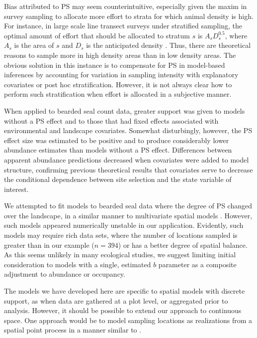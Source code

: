 \documentclass[times,mee,doublespace,]{besauth2}
\begin{document}
Bias attributed to PS may seem counterintuitive, especially given the maxim in survey sampling to allocate more effort to strata for which animal density is high. For instance, in large scale line transect surveys under stratified sampling, the optimal amount of effort that should be allocated to stratum $s$ is $A_s D_s^{0.5}$, where $A_s$ is the area of $s$ and $D_s$ is the anticipated density \citep[][eqn 7.7]{BucklandEtAl2001}.  Thus, there are theoretical reasons to sample more in high density areas than in low density areas. The obvious solution in this instance is to compensate for PS in model-based inferences by accounting for variation in sampling intensity with explanatory covariates or post hoc stratification. However, it is not always clear how to perform such stratification when effort is allocated in a subjective manner.

When applied to bearded seal count data, greater support was given to models without a PS effect and to those that had fixed effects associated with environmental and landscape covariates.  Somewhat disturbingly, however, the PS effect size was estimated to be positive and to produce considerably lower abundance estimates than models without a PS effect.  Differences between apparent abundance predictions decreased when covariates were added to model structure, confirming previous theoretical results \citep{DiggleEtAl2010,PatiEtAl2011} that covariates serve to decrease the conditional dependence between site selection and the state variable of interest.

We attempted to fit models to bearded seal data where the degree of PS changed over the landscape, in a similar manner to multivariate spatial models \citep{RoyleBerliner1999}. However, such models appeared numerically unstable in our application.  Evidently, such models may require rich data sets, where the number of locations sampled is greater than in our example ($n=394$) or has a better degree of spatial balance.  As this seems unlikely in many ecological studies, we suggest limiting initial consideration to models with a single, estimated $b$ parameter as a composite adjustment to abundance or occupancy.

The models we have developed here are specific to spatial models with discrete support, as when data are gathered at a plot level, or aggregated prior to analysis.  However, it should be possible to extend our approach to continuous space.  One approach would be to model sampling locations as realizations from a spatial point process in a manner similar to \citet{WartonShepherd2010}.
\end{document}
